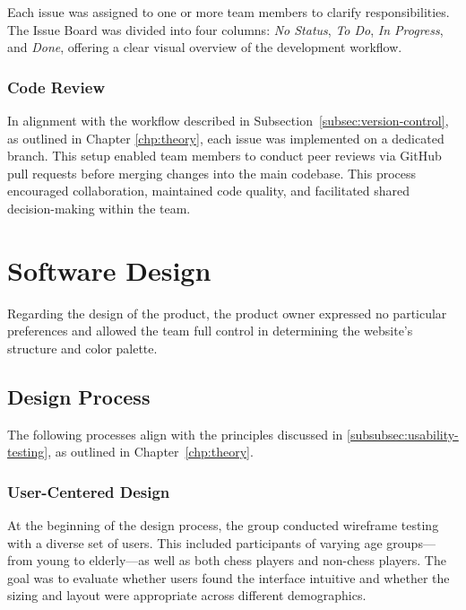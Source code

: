 Each issue was assigned to one or more team members to clarify responsibilities. The Issue Board was divided into four columns:
\textit{No Status}, \textit{To Do}, \textit{In Progress}, and \textit{Done}, offering a clear visual overview of the development workflow.

\subsubsection*{Code Review}

In alignment with the workflow described in Subsection~\ref{subsec:version-control}, as outlined in Chapter \ref{chp:theory}, each issue was implemented on a dedicated branch. This setup enabled team members to conduct peer reviews via GitHub pull requests before merging changes into the main codebase. This process encouraged collaboration, maintained code quality, and facilitated shared decision-making within the team.

\newpage

\section{Software Design}
\label{sec:software-design}

Regarding the design of the product, the product owner expressed no particular preferences and allowed the team full control in determining the website’s structure and color palette.

\subsection{Design Process}
\label{subsec:design-process}

The following processes align with the principles discussed in \ref{subsubsec:usability-testing}, as outlined in Chapter~\ref{chp:theory}.

\subsubsection*{User-Centered Design}
\label{subsubsec:user-centered-design}

At the beginning of the design process, the group conducted wireframe testing with a diverse set of users. This included participants of varying age groups—from young to elderly—as well as both chess players and non-chess players. The goal was to evaluate whether users found the interface intuitive and whether the sizing and layout were appropriate across different demographics. \\

